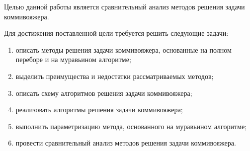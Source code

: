 
Целью данной работы является сравнительный анализ методов решения задачи коммивояжера.

Для достижения поставленной цели требуется решить следующие задачи:
\begin{enumerate}[label={\arabic*)}]
	\item описать методы решения задачи коммивояжера, основанные на полном переборе и на муравьином алгоритме;
	\item выделить преимущества и недостатки рассматриваемых методов;
	\item описать схему алгоритмов решения задачи коммивояжера;
	\item реализовать алгоритмы решения задачи коммивояжера;
	\item выполнить параметризацию метода, основанного на муравьином алгоритме;
	\item провести сравнительный анализ методов решения задачи коммивояжера.
\end{enumerate}

\clearpage
